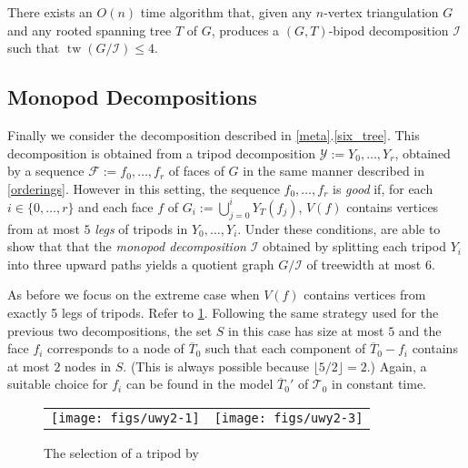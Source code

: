 \documentclass{patmorin}
\DeclareMathOperator{\tw}{tw}
\begin{document}
\begin{thm}\label{bipod_decomposition_algorithm}
  There exists an $O(n)$ time algorithm that, given any $n$-vertex triangulation $G$ and any rooted spanning tree $T$ of $G$, produces a $(G,T)$-bipod decomposition $\mathcal{I}$ such that $\tw(G/\mathcal{I})\le 4$.
\end{thm}


\subsection{Monopod Decompositions}

Finally we consider the decomposition described in \cref{meta}.\ref{six_tree}.   This decomposition is obtained from a tripod decomposition $\mathcal{Y}:=Y_0,\ldots,Y_r$, obtained by a sequence $\mathcal{F}:=f_0,\ldots,f_r$ of faces of $G$ in the same manner described in \cref{orderings}.  However in this setting, the sequence $f_0,\ldots,f_r$ is \emph{good} if, for each $i\in\{0,\ldots,r\}$ and each face $f$ of $G_i:=\bigcup_{j=0}^i Y_T(f_j)$, $V(f)$ contains vertices from at most $5$ \emph{legs} of tripods in $Y_{0},\ldots,Y_i$.  Under these conditions, \citet{ueckerdt.wood.ea:improved} are able to show that that the \emph{monopod decomposition} $\mathcal{I}$ obtained by splitting each tripod $Y_i$ into three upward paths yields a quotient graph $G/\mathcal{I}$ of treewidth at most $6$.

As before we focus on the extreme case when $V(f)$ contains vertices from exactly 5 legs of tripods. Refer to \cref{uwy}. Following the same strategy used for the previous two decompositions, the set $S$ in this case has size at most $5$ and the face $f_i$ corresponds to a node of $\overline{T}_0$ such that each component of $\overline{T}_0-f_i$ contains at most $2$ nodes in $S$.  (This is always possible because $\lfloor 5/2\rfloor=2$.)  Again, a suitable choice for $f_i$ can be found in the model $\overline{T}_0'$ of $\mathcal{T}_0$ in constant time.

\begin{figure}[htbp]
  \begin{center}
    \begin{tabular}{cc}
       \texttt{[image: figs/uwy2-1]} &
       \texttt{[image: figs/uwy2-3]}
     \end{tabular}
  \end{center}
  \caption{The selection of a tripod by \citet{ueckerdt.wood.ea:improved}}
  \label{uwy}
\end{figure}
\end{document}
